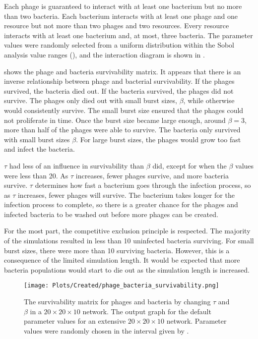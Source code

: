 Each phage is guaranteed to interact with at least one bacterium but no more than two bacteria. 
Each bacterium interacts with at least one phage and one resource but not more than two phages and two resources. 
Every resource interacts with at least one bacterium and, at most, three bacteria. 
The parameter values were randomly selected from a uniform distribution within the Sobol analysis value ranges (), and the interaction diagram is shown in . 

 shows the phage and bacteria survivability matrix. 
It appears that there is an inverse relationship between phage and bacterial survivability. 
If the phages survived, the bacteria died out. 
If the bacteria survived, the phages did not survive. 
The phages only died out with small burst sizes, $\beta$, while otherwise would consistently survive. The small burst size ensured that the phages could not proliferate in time. 
Once the burst size became large enough, around $\beta = 3$, more than half of the phages were able to survive. 
The bacteria only survived with small burst sizes $\beta$. 
For large burst sizes, the phages would grow too fast and infect the bacteria. 

$\tau$ had less of an influence in survivability than $\beta$ did, except for when the $\beta$ values were less than 20. 
As $\tau$ increases, fewer phages survive, and more bacteria survive. 
$\tau$ determines how fast a bacterium goes through the infection process, so as $\tau$ increases, fewer phages will survive. 
The bacterium takes longer for the infection process to complete, so there is a greater chance for the phages and infected bacteria to be washed out before more phages can be created. 

For the most part, the competitive exclusion principle is respected. 
The majority of the simulations resulted in less than 10 uninfected bacteria surviving. 
For small burst sizes, there were more than 10 surviving bacteria. 
However, this is a consequence of the limited simulation length. 
It would be expected that more bacteria populations would start to die out as the simulation length is increased. 

\begin{figure}[]
    \texttt{[image: Plots/Created/phage\_bacteria\_survivability.png]}
    \centering
    \caption{
        The survivability matrix for phages and bacteria by changing $\tau$ and $\beta$ in a $20\times 20\times 10$ network. 
        The output graph for the default parameter values for an extensive $20\times 20 \times 10$ network. 
        Parameter values were randomly chosen in the interval given by . 
    }
    \label{fig:created:survivability}
\end{figure}

